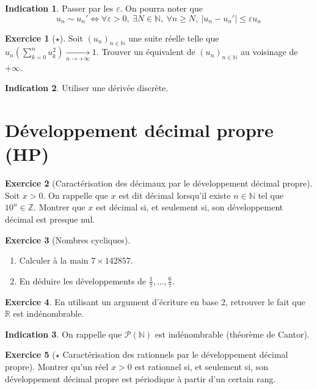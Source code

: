 \documentclass[french]{book}
\newcommand{\N}{\mathbb{N}}
\newcommand{\Z}{\mathbb{Z}}
\newcommand{\R}{\mathbb{R}}
\theoremstyle{definition}
\newtheorem{ex}{Exercice}[chapter]
\theoremstyle{theorem}
\newtheorem*{ind}{Indication}
\theoremstyle{remark}
\begin{document}
\begin{ind}
	Passer par les $\varepsilon$. On pourra noter que $$u_n\sim u_n'\iff\forall \varepsilon>0,\ \exists N\in\N,\ \forall n\geqslant N,\ \lvert u_n-u_n'\rvert\leqslant\varepsilon u_n$$
\end{ind}

\begin{ex}[$\star$]
	Soit $(u_n)_{n\in\N}$ une suite réelle telle que $\displaystyle u_n\left(\sum_{k=0}^{n}u_k^2\right)\xrightarrow[n\to+\infty]{}1$. Trouver un équivalent de $(u_n)_{n\in\N}$ au voisinage de $+\infty$.
\end{ex}

\begin{ind}
	Utiliser une dérivée discrète.
\end{ind}

\section{Développement décimal propre (HP)}

\begin{ex}[Caractérisation des décimaux par le développement décimal propre]
	Soit $x>0$. On rappelle que $x$ est dit décimal lorsqu'il existe $n\in\N$ tel que $10^n\in\Z$. Montrer que $x$ est décimal si, et seulement si, son développement décimal est presque nul.
\end{ex}

\begin{ex}[Nombres cycliques]
	\begin{enumerate}
		\item Calculer à la main $7\times 142857$.
		\item En déduire les développements de $\displaystyle\frac{1}{7},\ldots,\frac{6}{7}$.
	\end{enumerate}
\end{ex}

\begin{ex}
	En utilisant un argument d'écriture en base $2$, retrouver le fait que $\R$ est indénombrable.
\end{ex}

\begin{ind}
	On rappelle que $\mathcal{P}(\N)$ est indénombrable (théorème de Cantor).
\end{ind}

\begin{ex}[$\star$ Caractérisation des rationnels par le développement décimal propre]
	Montrer qu'un réel $x>0$ est rationnel si, et seulement si, son développement décimal propre est périodique à partir d'un certain rang.
\end{ex}
\end{document}
